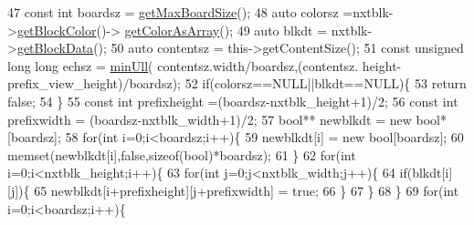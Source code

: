 \begin{DoxyCode}
47                     \textcolor{keyword}{const} \textcolor{keywordtype}{int} boardsz = \hyperlink{class_tetris_1_1_views_1_1_next_block_render_behavior_aa1d5fbc45ec963fa86fff0f73359d028}{getMaxBoardSize}();
48                     \textcolor{keyword}{auto} colorsz =nxtblk->\hyperlink{class_tetris_1_1_block_ad61aea379870fbb3668d49e4c3c748ed}{getBlockColor}()->
      \hyperlink{class_tetris_1_1_block_sub_modules_1_1_block_color_ac626961ee3894d89a7fc961e9f40c92f}{getColorAsArray}();
49                     \textcolor{keyword}{auto} blkdt = nxtblk->\hyperlink{class_tetris_1_1_block_a9bd2c3d6ccacff9a5f56f72336ba324f}{getBlockData}();
50                     \textcolor{keyword}{auto} contentsz = this->getContentSize();
51                     \textcolor{keyword}{const} \textcolor{keywordtype}{unsigned} \textcolor{keywordtype}{long} \textcolor{keywordtype}{long} echsz = \hyperlink{class_tetris_1_1_views_1_1_next_block_render_behavior_affd1ea6303953e254461752d30642fcf}{minUll}( contentsz.width/boardsz,(contentsz.
      height-prefix\_view\_height)/boardsz);
52                     \textcolor{keywordflow}{if}(colorsz==NULL||blkdt==NULL)\{
53                         \textcolor{keywordflow}{return} \textcolor{keyword}{false};
54                     \}
55                     \textcolor{keyword}{const} \textcolor{keywordtype}{int} prefixheight =(boardsz-nxtblk\_height+1)/2;
56                     \textcolor{keyword}{const} \textcolor{keywordtype}{int} prefixwidth = (boardsz-nxtblk\_width+1)/2;
57                     \textcolor{keywordtype}{bool}** newblkdt = \textcolor{keyword}{new} \textcolor{keywordtype}{bool}*[boardsz];
58                     \textcolor{keywordflow}{for}(\textcolor{keywordtype}{int} i=0;i<boardsz;i++)\{
59                         newblkdt[i] = \textcolor{keyword}{new} \textcolor{keywordtype}{bool}[boardsz];
60                         memset(newblkdt[i],\textcolor{keyword}{false},\textcolor{keyword}{sizeof}(\textcolor{keywordtype}{bool})*boardsz);
61                     \}
62                     \textcolor{keywordflow}{for}(\textcolor{keywordtype}{int} i=0;i<nxtblk\_height;i++)\{
63                         \textcolor{keywordflow}{for}(\textcolor{keywordtype}{int} j=0;j<nxtblk\_width;j++)\{
64                             \textcolor{keywordflow}{if}(blkdt[i][j])\{
65                                 newblkdt[i+prefixheight][j+prefixwidth] = \textcolor{keyword}{true};
66                             \}
67                         \}
68                     \}
69                     \textcolor{keywordflow}{for}(\textcolor{keywordtype}{int} i=0;i<boardsz;i++)\{

\end{DoxyCode}
